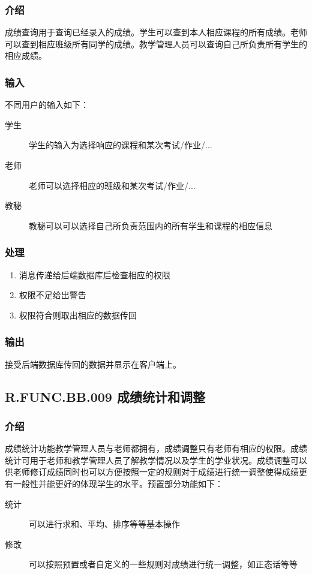 \begin{enumerate}
    \subsubsection{介绍}
    成绩查询用于查询已经录入的成绩。学生可以查到本人相应课程的所有成绩。老师可以查到相应班级所有同学的成绩。教学管理人员可以查询自己所负责所有学生的相应成绩。
    \subsubsection{输入}
    不同用户的输入如下：
    \begin{center}\begin{description}
      \item[学生] 学生的输入为选择响应的课程和某次考试/作业/...
      \item[老师] 老师可以选择相应的班级和某次考试/作业/...
      \item[教秘] 教秘可以可以选择自己所负责范围内的所有学生和课程的相应信息
    \end{description}\end{center}
    \subsubsection{处理}
    \begin{enumerate}
      \item 消息传递给后端数据库后检查相应的权限
      \item 权限不足给出警告
      \item 权限符合则取出相应的数据传回
    \end{enumerate}
    \subsubsection{输出}
    接受后端数据库传回的数据并显示在客户端上。

  \subsection{R.FUNC.BB.009 成绩统计和调整}
    \subsubsection{介绍}
    成绩统计功能教学管理人员与老师都拥有，成绩调整只有老师有相应的权限。成绩统计可用于老师和教学管理人员了解教学情况以及学生的学业状况。成绩调整可以供老师修订成绩同时也可以方便按照一定的规则对于成绩进行统一调整使得成绩更有一般性并能更好的体现学生的水平。预置部分功能如下：
    \begin{description}
      \item[统计] 可以进行求和、平均、排序等等基本操作
      \item[修改] 可以按照预置或者自定义的一些规则对成绩进行统一调整，如正态话等等
    \end{description}

\end{enumerate}
